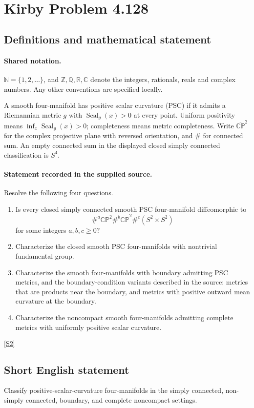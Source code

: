 \documentclass[11pt]{article}
\newcommand{\sref}[2]{\hyperlink{source:#1:#2}{[S#2]}}
\begin{document}
\section{Kirby Problem 4.128}\label{statement}

\subsection{Definitions and mathematical statement}

\paragraph{Shared notation.}$\mathbb N=\{1,2,\ldots\}$, and $\mathbb Z,\mathbb Q,\mathbb R,\mathbb C$ denote the integers, rationals, reals and complex numbers. Any other conventions are specified locally.


A smooth four-manifold has positive scalar curvature (PSC) if it admits a Riemannian metric $g$ with $\operatorname{Scal}_g(x)>0$ at every point. Uniform positivity means $\inf_x\operatorname{Scal}_g(x)>0$; completeness means metric completeness. Write $\overline{\mathbb{CP}}^{2}$ for the complex projective plane with reversed orientation, and $\#$ for connected sum. An empty connected sum in the displayed closed simply connected classification is $S^4$.
\paragraph{Statement recorded in the supplied source.}
Resolve the following four questions.
\begin{enumerate}
\item[(a)] Is every closed simply connected smooth PSC four-manifold diffeomorphic to
\[\#^{a}\mathbb{CP}^2\#^{b}\overline{\mathbb{CP}}^{2}\#^{c}(S^2\times S^2)\] for some integers $a,b,c\geq0$?
\item[(b)] Characterize the closed smooth PSC four-manifolds with nontrivial fundamental group.
\item[(c)] Characterize the smooth four-manifolds with boundary admitting PSC metrics, and the boundary-condition variants described in the source: metrics that are products near the boundary, and metrics with positive outward mean curvature at the boundary.
\item[(d)] Characterize the noncompact smooth four-manifolds admitting complete metrics with uniformly positive scalar curvature.
\end{enumerate} \sref{statement}{2}
\subsection{Short English statement}
Classify positive-scalar-curvature four-manifolds in the simply connected, non-simply connected, boundary, and complete noncompact settings.
\end{document}
